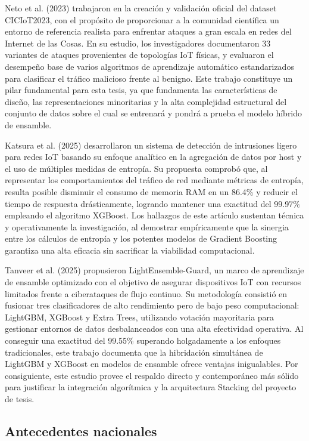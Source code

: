 Neto et al. (2023) trabajaron en la creación y validación oficial del dataset CICIoT2023, con el propósito de proporcionar a la comunidad científica un entorno de referencia realista para enfrentar ataques a gran escala en redes del Internet de las Cosas. En su estudio, los investigadores documentaron 33 variantes de ataques provenientes de topologías IoT físicas, y evaluaron el desempeño base de varios algoritmos de aprendizaje automático estandarizados para clasificar el tráfico malicioso frente al benigno. Este trabajo constituye un pilar fundamental para esta tesis, ya que fundamenta las características de diseño, las representaciones minoritarias y la alta complejidad estructural del conjunto de datos sobre el cual se entrenará y pondrá a prueba el modelo híbrido de ensamble.

Katsura et al. (2025) desarrollaron un sistema de detección de intrusiones ligero para redes IoT basando su enfoque analítico en la agregación de datos por host y el uso de múltiples medidas de entropía. Su propuesta comprobó que, al representar los comportamientos del tráfico de red mediante métricas de entropía, resulta posible disminuir el consumo de memoria RAM en un 86.4\% y reducir el tiempo de respuesta drásticamente, logrando mantener una exactitud del 99.97\% empleando el algoritmo XGBoost. Los hallazgos de este artículo sustentan técnica y operativamente la investigación, al demostrar empíricamente que la sinergia entre los cálculos de entropía y los potentes modelos de Gradient Boosting garantiza una alta eficacia sin sacrificar la viabilidad computacional.

Tanveer et al. (2025) propusieron LightEnsemble-Guard, un marco de aprendizaje de ensamble optimizado con el objetivo de asegurar dispositivos IoT con recursos limitados frente a ciberataques de flujo continuo. Su metodología consistió en fusionar tres clasificadores de alto rendimiento pero de bajo peso computacional: LightGBM, XGBoost y Extra Trees, utilizando votación mayoritaria para gestionar entornos de datos desbalanceados con una alta efectividad operativa. Al conseguir una exactitud del 99.55\% superando holgadamente a los enfoques tradicionales, este trabajo documenta que la hibridación simultánea de LightGBM y XGBoost en modelos de ensamble ofrece ventajas inigualables. Por consiguiente, este estudio provee el respaldo directo y contemporáneo más sólido para justificar la integración algorítmica y la arquitectura Stacking del proyecto de tesis.

\subsection{Antecedentes nacionales}

